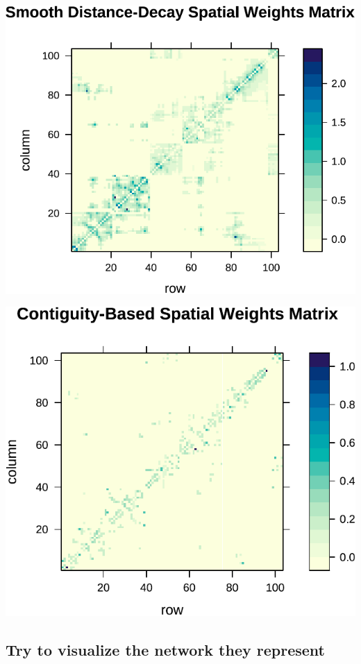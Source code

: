 \documentclass[
  a4paper,
]{article}
\begin{document}
\begin{center}\includegraphics{02_assignmnet_files/figure-latex/unnamed-chunk-8-2} \end{center}

\begin{center}\includegraphics{02_assignmnet_files/figure-latex/unnamed-chunk-8-3} \end{center}

\hypertarget{try-to-visualize-the-network-they-represent}{%
\subsection{Try to visualize the network they
represent}\label{try-to-visualize-the-network-they-represent}}
\end{document}
